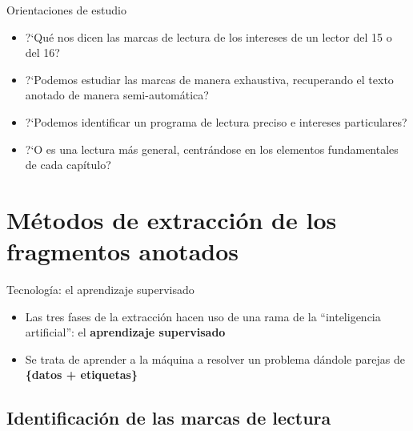 \documentclass[11pt,aspectratio=169]{beamer}
\begin{document}
\begin{frame}{Orientaciones de estudio}
\begin{itemize}
\item ?`Qué nos dicen las marcas de lectura de los intereses de un lector del 15 o del 16?
\item ?`Podemos estudiar las marcas de manera exhaustiva, recuperando el texto anotado de manera semi-automática?
\item ?`Podemos identificar un programa de lectura preciso e intereses particulares?
\item ?`O es una lectura más general, centrándose en los elementos fundamentales de cada capítulo?
\end{itemize}
\end{frame}







\section{Métodos de extracción de los fragmentos anotados}

\begin{frame}{Tecnología: el aprendizaje supervisado}
\begin{itemize}
\item Las tres fases de la extracción hacen uso de una rama de la \enquote{inteligencia artificial}: el 
\textbf{aprendizaje supervisado}
\item Se trata de aprender a la máquina a resolver un problema dándole parejas de \textbf{\{datos + etiquetas\}}
\end{itemize}
\end{frame}

\subsection{Identificación de las marcas de lectura}
\end{document}
